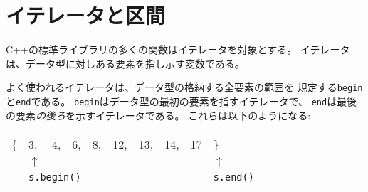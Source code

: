 \begin{comment}
\section{Iterators and ranges}

\index{iterator}
Many functions in the C++ standard library
operate with iterators.
An \key{iterator} is a variable that points
to an element in a data structure.

The often used iterators \texttt{begin}
and \texttt{end} define a range that contains
all elements in a data structure.
The iterator \texttt{begin} points to
the first element in the data structure,
and the iterator \texttt{end} points to
the position \emph{after} the last element.
The situation looks as follows:

\end{comment}

\section{イテレータと区間}


C++の標準ライブラリの多くの関数はイテレータを対象とする。
イテレータは、データ型に対しある要素を指し示す変数である。

よく使われるイテレータは、データ型の格納する全要素の範囲を
規定する\texttt{begin}と\texttt{end}である。
\texttt{begin}はデータ型の最初の要素を指すイテレータで、
\texttt{end}は最後の要素\emph{の後ろ}を示すイテレータである。
これらは以下のようになる:

\begin{center}
\begin{tabular}{llllllllll}
\{ & 3, & 4, & 6, & 8, & 12, & 13, & 14, & 17 & \} \\
& $\uparrow$ & & & & & & & & $\uparrow$ \\
& \multicolumn{3}{l}{\texttt{s.begin()}} & & & & & & \texttt{s.end()} \\
\end{tabular}
\end{center}

\begin{comment}
Note the asymmetry in the iterators:
\texttt{s.begin()} points to an element in the data structure,
while \texttt{s.end()} points outside the data structure.
Thus, the range defined by the iterators is \emph{half-open}.
\end{comment}

